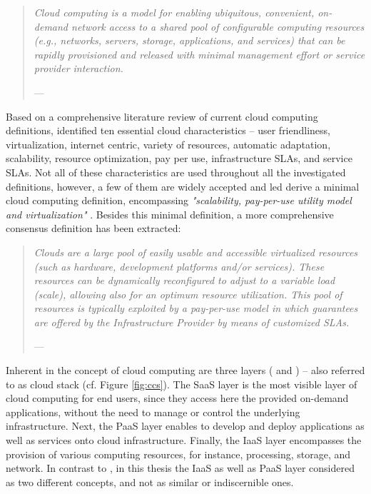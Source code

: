 \begin{quotation}{\slshape 
Cloud computing is a model for enabling ubiquitous, convenient, on-demand network access to a shared pool of configurable computing resources (e.g., networks, servers, storage, applications, and services) that can be rapidly provisioned and released with minimal management effort or service provider interaction.}
\vspace*{-7pt}
\begin{flushright}
	--- \citealp[p. 2]{Mell2011}
\end{flushright}
\end{quotation}

Based on a comprehensive literature review of current cloud computing definitions, \citet{Vaquero2009} identified ten essential cloud characteristics -- user friendliness, virtualization, internet centric, variety of resources, automatic adaptation, scalability, resource optimization, pay per use, infrastructure \acp{SLA}, and service \acp{SLA}. Not all of these characteristics are used throughout all the investigated definitions, however, a few of them are widely accepted and led \citet{Vaquero2009} derive a minimal cloud computing definition, encompassing \textit{"scalability, pay-per-use utility model and virtualization"} \citep[p. 51]{Vaquero2009}. Besides this minimal definition, a more comprehensive consensus definition has been extracted:

\begin{quotation}{\slshape 
Clouds are a large pool of easily usable and accessible virtualized resources (such as hardware, development platforms and/or services). These resources can be dynamically reconfigured to adjust to a variable load (scale), allowing also for an optimum resource utilization. This pool of resources is typically exploited by a pay-per-use model in which guarantees are offered by the Infrastructure Provider by means of customized \acp{SLA}.}
\vspace*{-7pt}
\begin{flushright}
	--- \citealp[p. 51]{Vaquero2009}
\end{flushright}
\end{quotation}

Inherent in the concept of cloud computing are three layers (\citealp[pp. 118-119]{Iyer2010} and \citealp[pp. 2-3]{Mell2011}) -- also referred to as cloud stack (cf. Figure \ref{fig:ccs}). The \ac{SaaS} layer is the most visible layer of cloud computing for end users, since they access here the provided on-demand applications, without the need to manage or control the underlying infrastructure. Next, the \ac{PaaS} layer enables to develop and deploy applications as well as services onto cloud infrastructure. Finally, the \ac{IaaS} layer encompasses the provision of various computing resources, for instance, processing, storage, and network. In contrast to \citet[p.50]{Armbrust2010}, in this thesis the \ac{IaaS} as well as \ac{PaaS} layer considered as two different concepts, and not as similar or indiscernible ones. 


